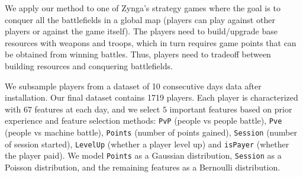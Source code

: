 We apply our method to one of  Zynga's strategy games where the goal is to conquer all the battlefields
in a global map (players can play against other players or against the game itself). The players need to build/upgrade base resources with  weapons and troops, which in turn 
requires game points that can be obtained from winning battles.  Thus,  players need to 
tradeoff between building resources and conquering battlefields.


We subsample players from  a dataset of 10 consecutive days data after installation. Our final dataset contains 1719 players.
Each player is characterized with $67$ features at each day, and we select $5$ important 
features based on prior experience and feature selection methods: \texttt{PvP} (people vs people battle), 
\texttt{Pve} (people vs machine battle), \texttt{Points} (number of points gained), \texttt{Session} 
(number of session started), \texttt{LevelUp} (whether a player level up) and \texttt{isPayer} (whether
the player paid). We model \texttt{Points}  as a Gaussian distribution, \texttt{Session} as a
Poisson distribution, and the remaining features as a Bernoulli distribution.






